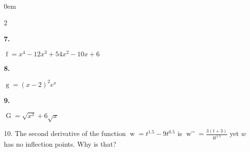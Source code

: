 \documentclass[12pt,]{book}
\theoremstyle{plain}
\theoremstyle{definition}
\numberwithin{equation}{section}
\newenvironment{exercisegroup}%
{\medskip\noindent}%
{\par\bigskip}%
\newlength{\exercisegroupindent}%
\newlength{\exercisegroupitemwidth}%
\newenvironment{exercisegrouplist}%
{\vspace{-\partopsep}%
\begin{adjustwidth}{\exercisegroupindent}{0em}}%
{\end{adjustwidth}%
\vspace{-\partopsep}%
\vspace{\baselineskip}}%
\newenvironment{exercisegroupbycol}[1]%
{\begin{exercisegrouplist}%
\vspace{-\multicolsep}%
\begin{multicols}{#1}%
\setlength{\parindent}{0em}%
\setlength{\exercisegroupitemwidth}{\linewidth}}%
{\end{multicols}%
\vspace{-\multicolsep}%
\end{exercisegrouplist}}%
\newenvironment{exercisegroupitem}[1]%
{\begin{minipage}[t]{\exercisegroupitemwidth}
\vspace{0pt}%
{\bfseries#1}%
\rule{0pt}{\baselineskip}}{\strut%
\end{minipage}%
\hspace{\columnsep}}%
\providecommand\phantomsection{}
\newcommand{\fe}[2]{\mathop{{#1}{\left(#2\right)}}}
\newcommand{\sd}[1]{#1''}
\begin{document}
\begin{exerciselist}
\begin{exercisegroup}
\par
\begin{exercisegroupbycol}{2}%
\begin{exercisegroupitem}{7. }\phantomsection\hypertarget{exercise-make-second-derivative-table-first}{\null}
\(\fe{f}{x}=x^4-12x^3+54x^2-10x+6\)%
\end{exercisegroupitem}%
\par%
\begin{exercisegroupitem}{8. }\phantomsection\hypertarget{exercise-435}{\null}
\(\fe{g}{x}=(x-2)^2e^x\)%
\end{exercisegroupitem}%
\par%
\begin{exercisegroupitem}{9. }\phantomsection\hypertarget{exercise-make-second-derivative-table-last}{\null}
\(\fe{G}{x}=\sqrt{x^3}+6\sqrt{x}\)%
\end{exercisegroupitem}%
\par%
\end{exercisegroupbycol}%
\end{exercisegroup}%
\item[10.]\phantomsection\hypertarget{exercise-437}{\null}The second derivative of the function \(\fe{w}{t}=t^{1.5}-9t^{0.5}\) is \(\fe{\sd{w}}{t}=\frac{3(t+3)}{4t^{1.5}}\) yet \(w\) has no inflection points. Why is that?%
\par\smallskip
\end{exerciselist}
\typeout{************************************************}
\typeout{************************************************}
\end{document}
